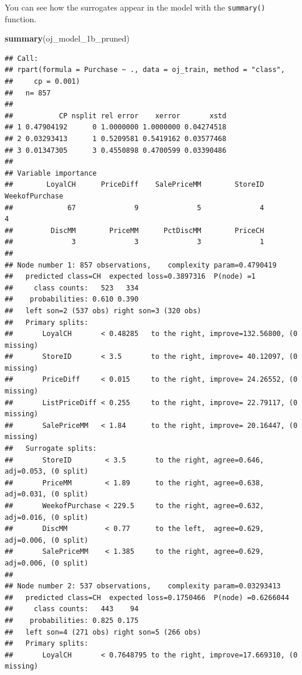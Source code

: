 \documentclass[
]{book}
\newenvironment{Shaded}{\begin{snugshade}}{\end{snugshade}}
\newcommand{\KeywordTok}[1]{\textcolor[rgb]{0.13,0.29,0.53}{\textbf{#1}}}
\newcommand{\NormalTok}[1]{#1}
\begin{document}
You can see how the surrogates appear in the model with the \texttt{summary()} function.

\begin{Shaded}
\begin{Highlighting}[]
\KeywordTok{summary}\NormalTok{(oj_model_1b_pruned)}
\end{Highlighting}
\end{Shaded}

\begin{verbatim}
## Call:
## rpart(formula = Purchase ~ ., data = oj_train, method = "class", 
##     cp = 0.001)
##   n= 857 
## 
##           CP nsplit rel error    xerror       xstd
## 1 0.47904192      0 1.0000000 1.0000000 0.04274518
## 2 0.03293413      1 0.5209581 0.5419162 0.03577468
## 3 0.01347305      3 0.4550898 0.4700599 0.03390486
## 
## Variable importance
##        LoyalCH      PriceDiff    SalePriceMM        StoreID WeekofPurchase 
##             67              9              5              4              4 
##         DiscMM        PriceMM      PctDiscMM        PriceCH 
##              3              3              3              1 
## 
## Node number 1: 857 observations,    complexity param=0.4790419
##   predicted class=CH  expected loss=0.3897316  P(node) =1
##     class counts:   523   334
##    probabilities: 0.610 0.390 
##   left son=2 (537 obs) right son=3 (320 obs)
##   Primary splits:
##       LoyalCH       < 0.48285   to the right, improve=132.56800, (0 missing)
##       StoreID       < 3.5       to the right, improve= 40.12097, (0 missing)
##       PriceDiff     < 0.015     to the right, improve= 24.26552, (0 missing)
##       ListPriceDiff < 0.255     to the right, improve= 22.79117, (0 missing)
##       SalePriceMM   < 1.84      to the right, improve= 20.16447, (0 missing)
##   Surrogate splits:
##       StoreID        < 3.5       to the right, agree=0.646, adj=0.053, (0 split)
##       PriceMM        < 1.89      to the right, agree=0.638, adj=0.031, (0 split)
##       WeekofPurchase < 229.5     to the right, agree=0.632, adj=0.016, (0 split)
##       DiscMM         < 0.77      to the left,  agree=0.629, adj=0.006, (0 split)
##       SalePriceMM    < 1.385     to the right, agree=0.629, adj=0.006, (0 split)
## 
## Node number 2: 537 observations,    complexity param=0.03293413
##   predicted class=CH  expected loss=0.1750466  P(node) =0.6266044
##     class counts:   443    94
##    probabilities: 0.825 0.175 
##   left son=4 (271 obs) right son=5 (266 obs)
##   Primary splits:
##       LoyalCH       < 0.7648795 to the right, improve=17.669310, (0 missing)

\end{verbatim}
\end{document}
